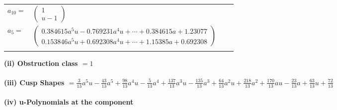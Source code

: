 \documentclass[1p]{elsarticle_modified}
\theoremstyle{definition}
\begin{document}
\begin{tabular}{m{7pt} m{180pt} m{7pt} m{180pt} }
\flushright $a_{10}=$&$\begin{pmatrix}1\\u-1\end{pmatrix}$ \\
\flushright $a_{5}=$&$\begin{pmatrix}0.384615 a^{5} u-0.769231 a^{4} u+\cdots+0.384615 a+1.23077\\0.153846 a^{5} u+0.692308 a^{4} u+\cdots+1.15385 a+0.692308\end{pmatrix}$\\&\end{tabular}
\flushleft \textbf{(ii) Obstruction class $= 1$}\\~\\
\flushleft \textbf{(iii) Cusp Shapes $= \frac{3}{13} a^5 u-\frac{43}{13} a^5+\frac{98}{13} a^4 u-\frac{5}{13} a^4+\frac{137}{13} a^3 u-\frac{135}{13} a^3+\frac{64}{13} a^2 u+\frac{218}{13} a^2+\frac{170}{13} a u-\frac{23}{13} a+\frac{63}{13} u+\frac{72}{13}$}\\~\\
\newpage\renewcommand{\arraystretch}{1}
\flushleft \textbf{(iv) u-Polynomials at the component}\newline \\
\end{document}
